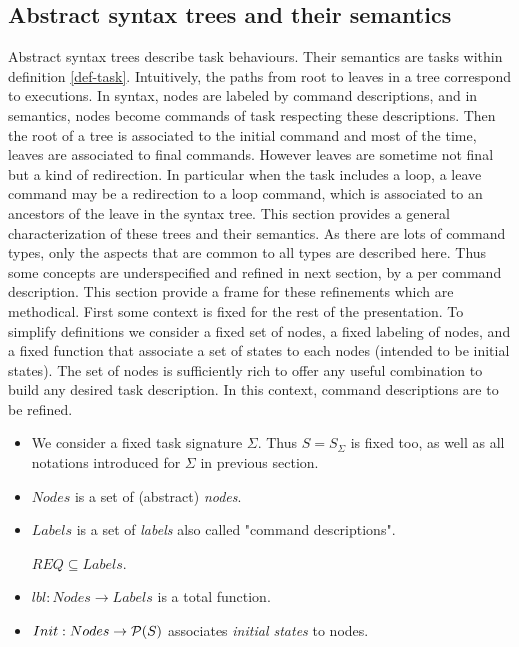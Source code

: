 \documentclass{article}
\begin{document}
\subsection{Abstract syntax trees and their semantics}
Abstract syntax trees describe task behaviours. Their semantics are tasks within definition \ref{def-task}. Intuitively, the paths from root to leaves in a tree correspond to executions. In syntax, nodes are labeled by command descriptions, and in semantics, nodes become commands of task respecting these descriptions. Then the root of a tree is associated to the initial command and most of the time, leaves are associated to final commands. However leaves are sometime not final but a kind of redirection. In particular when the task includes a loop, a leave command may be a redirection to a loop command, which is associated to an ancestors of the leave in the syntax tree. This section provides a general characterization of these trees and their semantics. As there are lots of command types, only the aspects that are common to all types are described here. Thus some concepts are underspecified and refined in next section, by a per command description. This section provide a frame for these refinements which are methodical. First some context is fixed for the rest of the presentation.
To simplify definitions we consider a fixed set of nodes, a fixed labeling of nodes, and a fixed function that associate a set of states to each nodes (intended to be initial states). The set of nodes is sufficiently rich to offer any useful combination to build any desired task description. In this context, command descriptions are to be refined.
\begin{definition}\label{def-context}
\begin{itemize}
\item We consider a fixed task signature $\Sigma$. Thus $S=S_\Sigma$ is fixed too, as well as all notations introduced for $\Sigma$ in previous section.
\item $Nodes$ is a set of (abstract) {\em nodes}.
\item $Labels$ is a set of {\em labels} also called "command descriptions".\par
      $REQ\subseteq Labels$.
\item $lbl: Nodes\rightarrow Labels$ is a total function.
\item $Init: Nodes\rightarrow {\cal P}(S)$ associates {\em initial states} to nodes.
\end{itemize}
\end{definition}
\end{document}
